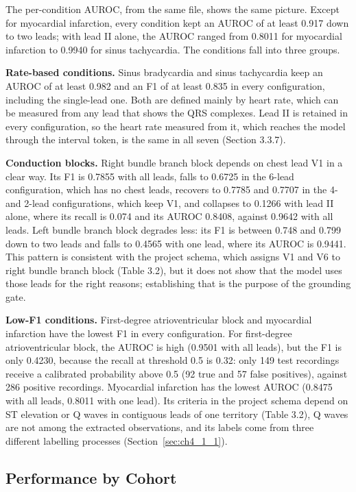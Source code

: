 The per-condition AUROC, from the same file, shows the same picture. Except for myocardial infarction, every condition kept an AUROC of at least 0.917 down to two leads; with lead II alone, the AUROC ranged from 0.8011 for myocardial infarction to 0.9940 for sinus tachycardia. The conditions fall into three groups.

\textbf{Rate-based conditions.} Sinus bradycardia and sinus tachycardia keep an AUROC of at least 0.982 and an F1 of at least 0.835 in every configuration, including the single-lead one. Both are defined mainly by heart rate, which can be measured from any lead that shows the QRS complexes. Lead II is retained in every configuration, so the heart rate measured from it, which reaches the model through the interval token, is the same in all seven (Section 3.3.7).

\textbf{Conduction blocks.} Right bundle branch block depends on chest lead V1 in a clear way. Its F1 is 0.7855 with all leads, falls to 0.6725 in the 6-lead configuration, which has no chest leads, recovers to 0.7785 and 0.7707 in the 4- and 2-lead configurations, which keep V1, and collapses to 0.1266 with lead II alone, where its recall is 0.074 and its AUROC 0.8408, against 0.9642 with all leads. Left bundle branch block degrades less: its F1 is between 0.748 and 0.799 down to two leads and falls to 0.4565 with one lead, where its AUROC is 0.9441. This pattern is consistent with the project schema, which assigns V1 and V6 to right bundle branch block (Table 3.2), but it does not show that the model uses those leads for the right reasons; establishing that is the purpose of the grounding gate.

\textbf{Low-F1 conditions.} First-degree atrioventricular block and myocardial infarction have the lowest F1 in every configuration. For first-degree atrioventricular block, the AUROC is high (0.9501 with all leads), but the F1 is only 0.4230, because the recall at threshold 0.5 is 0.32: only 149 test recordings receive a calibrated probability above 0.5 (92 true and 57 false positives), against 286 positive recordings. Myocardial infarction has the lowest AUROC (0.8475 with all leads, 0.8011 with one lead). Its criteria in the project schema depend on ST elevation or Q waves in contiguous leads of one territory (Table 3.2), Q waves are not among the extracted observations, and its labels come from three different labelling processes (Section~\ref{sec:ch4_1_1}).

\subsection{Performance by Cohort}\label{sec:ch4_4_5}

